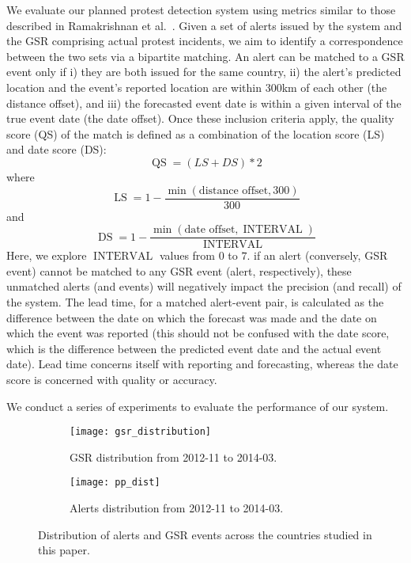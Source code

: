 We evaluate our planned protest detection system
using metrics similar to those described in 
Ramakrishnan et al.~\cite{emberskdd}.
Given a set of alerts issued by the system and the GSR comprising actual protest incidents, we aim to identify
a correspondence between the two sets via a bipartite matching.
An alert can be matched to a GSR event only if i) they are both issued for the same country, 
ii) the alert's predicted location and the event's reported location are within 300km of each
other (the distance offset), and iii) the forecasted event date is within a given interval of the true event date (the date offset).
Once these inclusion criteria apply, the quality score (QS) of the match is defined as a combination of the
location score (LS) and date score (DS):
\begin{equation}
    \operatorname{QS}= (LS + DS)*2
\end{equation}
\noindent
where
\begin{equation}
    \operatorname{LS}=1 - \frac{\min(\textrm{distance offset}, 300)}{300}
\end{equation}
and 
\begin{equation}
    \operatorname{DS}=1 - \frac{\min(\textrm{date offset}, \operatorname{INTERVAL})}{\operatorname{INTERVAL}}
\end{equation}
Here, we explore $\operatorname{INTERVAL}$ values from $0$ to $7$.
if an alert (conversely, GSR event) cannot be matched to any GSR event (alert, respectively), these unmatched
alerts (and events) will negatively impact the precision (and recall) of the system. The lead time,
for a matched alert-event pair,
is calculated as the difference between the date on which the forecast was made and the date on which the event
was reported (this should not be confused with the date score, which is the difference between the
predicted event date and the actual event date). Lead time concerns itself with reporting and forecasting, whereas
the date score is concerned with quality or accuracy.

We conduct a series of experiments to evaluate the performance of our system.\\

\begin{figure*}
\centering
\begin{subfigure}{\columnwidth}
  \centering
  \texttt{[image: gsr\_distribution]}
  \vspace{-2em}
  \caption{GSR distribution from 2012-11 to 2014-03.}
  \label{fig:gsrdistribution}
\end{subfigure}%
\begin{subfigure}{\columnwidth}
  \centering
  \texttt{[image: pp\_dist]}
  \vspace{-2em}
  \caption{Alerts distribution from 2012-11 to 2014-03.}
  \label{fig:ppdistribution}
\end{subfigure}
  \vspace{-0.5em}
\caption{Distribution of alerts and GSR events across the countries studied in this paper.}
\label{fig:distribution}
\end{figure*}

